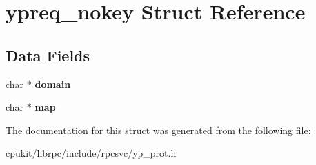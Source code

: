 \hypertarget{structypreq__nokey}{}\section{ypreq\+\_\+nokey Struct Reference}
\label{structypreq__nokey}
\subsection*{Data Fields}
\begin{DoxyCompactItemize}
\item 
\mbox{\label{structypreq__nokey_a09a61a46ba5bacc0a12c95a347c9ae56}} 
char $\ast$ {\bfseries domain}
\item 
\mbox{\label{structypreq__nokey_a6bf0285f34a19b8f1ff9b3a7c5e9894e}} 
char $\ast$ {\bfseries map}
\end{DoxyCompactItemize}


The documentation for this struct was generated from the following file\+:\begin{DoxyCompactItemize}
\item 
cpukit/librpc/include/rpcsvc/yp\+\_\+prot.\+h\end{DoxyCompactItemize}
